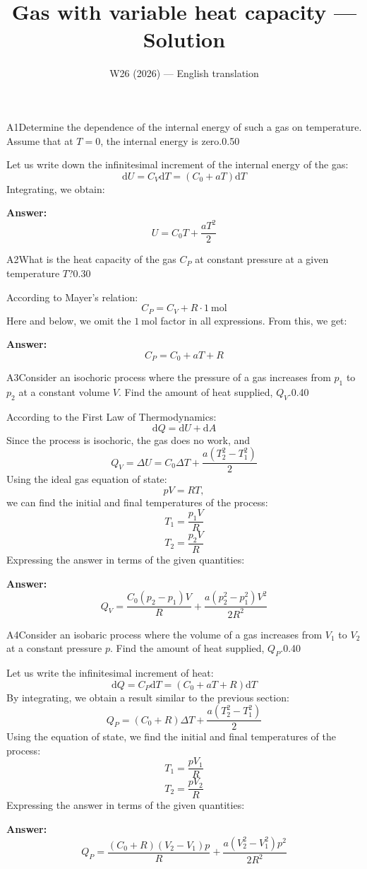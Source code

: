 \documentclass[11pt,a4paper]{article}
\title{\textbf{Gas with variable heat capacity --- Solution}}
\author{\normalsize W26 (2026) — English translation}
\date{}
\begin{document}
\maketitle\vspace{-0.5em}
\begin{solcard}{A1}{Determine the dependence of the internal energy of such a gas on temperature. Assume that at $T = 0$, the internal energy is zero.}{0.50}

Let us write down the infinitesimal increment of the internal energy of the gas: \[\mathrm dU=C_V\mathrm dT=(C_0+aT)\mathrm dT\]Integrating, we obtain:

\par\smallskip\noindent\textbf{Answer:} $$U=C_0T+\dfrac{aT^2}{2}$$
\end{solcard}

\begin{solcard}{A2}{What is the heat capacity of the gas $C_P$ at constant pressure at a given temperature $T$?}{0.30}

According to Mayer's relation: $$C_P =C_V+R\cdot 1~\mathrm{mol}$$Here and below, we omit the $1~\mathrm{mol}$ factor in all expressions. From this, we get:

\par\smallskip\noindent\textbf{Answer:} \[C_P=C_0+aT+R\]
\end{solcard}

\begin{solcard}{A3}{Consider an isochoric process where the pressure of a gas increases from $p_1$ to $p_2$ at a constant volume $V$. Find the amount of heat supplied, $Q_V$.}{0.40}

According to the First Law of Thermodynamics: \[ \mathrm dQ=\mathrm dU+\mathrm dA\]Since the process is isochoric, the gas does no work, and \[Q_V=\Delta U=C_0\Delta T+\dfrac{a(T_2^2-T_1^2)}{2}\]Using the ideal gas equation of state: \[pV=RT,\] we can find the initial and final temperatures of the process: \[T_1=\dfrac{p_1V}{R}\]\[T_2=\dfrac{p_2V}{R}\]Expressing the answer in terms of the given quantities:

\par\smallskip\noindent\textbf{Answer:} \[Q_V=\dfrac{C_0(p_2-p_1)V}{R}+\dfrac{a(p_2^2-p_1^2)V^2}{2R^2}\]
\end{solcard}

\begin{solcard}{A4}{Consider an isobaric process where the volume of a gas increases from $V_1$ to $V_2$ at a constant pressure $p$. Find the amount of heat supplied, $Q_P$.}{0.40}

Let us write the infinitesimal increment of heat: \[\mathrm dQ=C_P\mathrm dT=(C_0+aT+R)\mathrm dT\]By integrating, we obtain a result similar to the previous section: \[Q_P=(C_0+R)\Delta T+\dfrac{a(T_2^2-T_1^2)}{2}\]Using the equation of state, we find the initial and final temperatures of the process: \[T_1=\dfrac{pV_1}{R}\]\[T_2=\dfrac{pV_2}{R}\]Expressing the answer in terms of the given quantities:

\par\smallskip\noindent\textbf{Answer:} $$Q_P=\dfrac{(C_0+R)(V_2-V_1)p}{R}+\dfrac{a(V_2^2-V_1^2)p^2}{2R^2}$$
\end{solcard}
\end{document}
